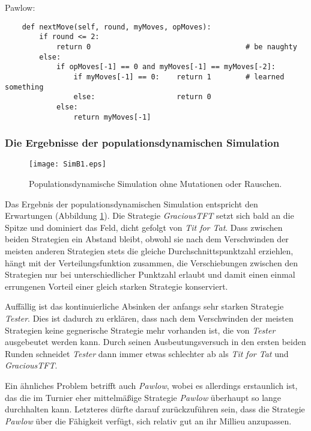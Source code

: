 \documentclass[12pt,a4paper,ngerman]{article}
\begin{document}
\begin{scriptsize}
\begin{center}Pawlow:\end{center}
\begin{verbatim}
    def nextMove(self, round, myMoves, opMoves):
        if round <= 2:
            return 0                                    # be naughty
        else:
            if opMoves[-1] == 0 and myMoves[-1] == myMoves[-2]:
                if myMoves[-1] == 0:    return 1        # learned something
                else:                   return 0
            else:
                return myMoves[-1]
\end{verbatim}
\end{scriptsize}


\subsubsection{Die Ergebnisse der populationsdynamischen Simulation}

\begin{figure}
\begin{center}
\texttt{[image: SimB1.eps]}
\caption{\label{SimB1} Populationsdynamische Simulation ohne
Mutationen oder Rauschen.}
\end{center}
\end{figure}

Das Ergebnis der populationsdynamischen Simulation entspricht den
Erwartungen (Abbildung \ref{SimB1}). Die Strategie {\em GraciousTFT}
setzt sich bald an die Spitze und dominiert das Feld, dicht gefolgt
von {\em Tit for Tat}. Dass zwischen beiden Strategien ein Abstand
bleibt, obwohl sie nach dem Verschwinden der meisten anderen
Strategien stets die gleiche Durchschnittspunktzahl erziehlen, hängt
mit der Verteilungsfunktion zusammen, die Verschiebungen zwischen den
Strategien nur bei unterschiedlicher Punktzahl erlaubt und damit einen
einmal errungenen Vorteil einer gleich starken Strategie konserviert.

Auffällig ist das kontinuierliche Absinken der anfangs sehr starken
Strategie {\em Tester}. Dies ist dadurch zu erklären, dass nach dem
Verschwinden der meisten Strategien keine gegnerische Strategie mehr
vorhanden ist, die von {\em Tester} ausgebeutet werden kann. Durch
seinen Ausbeutungsversuch in den ersten beiden Runden schneidet {\em
  Tester} dann immer etwas schlechter ab als {\em Tit for Tat} und
{\em GraciousTFT}.

Ein ähnliches Problem betrifft auch {\em Pawlow}, wobei es allerdings
erstaunlich ist, das die im Turnier eher mittelmäßige Strategie {\em
  Pawlow} überhaupt so lange durchhalten kann. Letzteres dürfte darauf
zurückzuführen sein, dass die Strategie {\em Pawlow} über die
Fähigkeit verfügt, sich relativ gut an ihr Millieu anzupassen.
\end{document}
